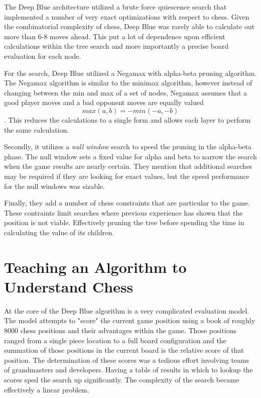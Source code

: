 \documentclass[paper=letter, fontsize=12pt]{article}
\begin{document}
The Deep Blue architecture utilized a brute force quiescence search that implemented a number of very exact optimizations with respect to chess. Given the combinatorial complexity of chess, Deep Blue was rarely able to calculate out more than 6-8 moves ahead. This put a lot of dependence upon efficient calculations within the tree search and more importantly a precise board evaluation for each node.\newline

For the search, Deep Blue utilized a Negamax\cite{negamax} with alpha-beta pruning algorithm. The Negamax algorithm is similar to the minimax algorithm, however instead of changing between the min and max of a set of nodes, Negamax assumes that a good player moves and a bad opponent moves are equally valued \[max(a,b)=-min(-a,-b) \]. This reduces the calculations to a single form and allows each layer to perform the same calculation.\newline

Secondly, it utilizes a \textit{null window} search to speed the pruning in the alpha-beta phase. The null window sets a fixed value for alpha and beta to narrow the search when the game results are nearly certain. They mention that additional searches may be required if they are looking for exact values, but the speed performance for the null windows was sizable.

Finally, they add a number of chess constraints that are particular to the game. These contraints limit searches where previous experience has shown that the position is not viable. Effectively pruning the tree before spending the time in calculating the value of its children.\newline

\section{Teaching an Algorithm to Understand Chess}

At the core of the Deep Blue algorithm is a very complicated evaluation model. The model attempts to "score" the current game position using a book of roughly 8000 chess positions and their advantages within the game. Those positions ranged from a single piece location to a full board configuration and the summation of those positions in the current board is the relative score of that position. The determination of these scores was a tedious effort involving teams of grandmasters and developers. Having a table of results in which to lookup the scores sped the search up significantly. The complexity of the search became effectively a linear problem.\newline
\end{document}
